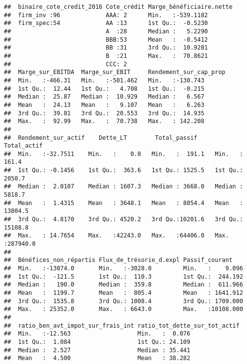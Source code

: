 \documentclass[
]{article}
\begin{document}
\begin{verbatim}
##  binaire_cote_credit_2016 Cote_crédit Marge_bénéficiaire.nette
##  firm_inv :96             AAA: 2      Min.   :-539.1182       
##  firm_spec:54             AA :13      1st Qu.:  -0.5230       
##                           A  :28      Median :   5.2290       
##                           BBB:53      Mean   :  -0.5412       
##                           BB :31      3rd Qu.:  10.9281       
##                           B  :21      Max.   :  70.8621       
##                           CCC: 2                              
##  Marge_sur_EBITDA  Marge_sur_EBIT     Rendement_sur_cap_prop
##  Min.   :-466.31   Min.   :-501.462   Min.   :-130.743      
##  1st Qu.:  12.44   1st Qu.:   4.708   1st Qu.:  -0.215      
##  Median :  25.87   Median :  10.929   Median :   6.567      
##  Mean   :  24.13   Mean   :   9.107   Mean   :   6.263      
##  3rd Qu.:  39.81   3rd Qu.:  20.553   3rd Qu.:  14.935      
##  Max.   :  92.99   Max.   :  70.738   Max.   : 142.208      
##                                                             
##  Rendement_sur_actif    Dette_LT        Total_passif      Total_actif      
##  Min.   :-32.7511    Min.   :    0.0   Min.   :  191.1   Min.   :   161.4  
##  1st Qu.: -0.1456    1st Qu.:  363.6   1st Qu.: 1525.5   1st Qu.:  2050.7  
##  Median :  2.0107    Median : 1607.3   Median : 3668.0   Median :  5818.7  
##  Mean   :  1.4315    Mean   : 3648.1   Mean   : 8054.4   Mean   : 13804.5  
##  3rd Qu.:  4.8170    3rd Qu.: 4520.2   3rd Qu.:10201.6   3rd Qu.: 15108.8  
##  Max.   : 14.7654    Max.   :42243.0   Max.   :64406.0   Max.   :287940.0  
##                                                                            
##  Bénéfices_non_répartis Flux_de_trésorie_d.expl Passif_courant     
##  Min.   :-13074.0       Min.   :-3028.0         Min.   :    9.096  
##  1st Qu.:  -121.5       1st Qu.:  110.3         1st Qu.:  244.192  
##  Median :   190.0       Median :  359.8         Median :  611.966  
##  Mean   :  1199.7       Mean   :  805.4         Mean   : 1641.912  
##  3rd Qu.:  1535.8       3rd Qu.: 1008.4         3rd Qu.: 1709.000  
##  Max.   : 25352.0       Max.   : 6643.0         Max.   :10108.000  
##                                                                    
##  ratio_ben_avt_impot_sur_frais_int ratio_tot_dette_sur_tot_actif
##  Min.   :-12.563                   Min.   :  0.076              
##  1st Qu.:  1.084                   1st Qu.: 24.109              
##  Median :  2.527                   Median : 35.441              
##  Mean   :  4.500                   Mean   : 38.282              

\end{verbatim}
\end{document}
